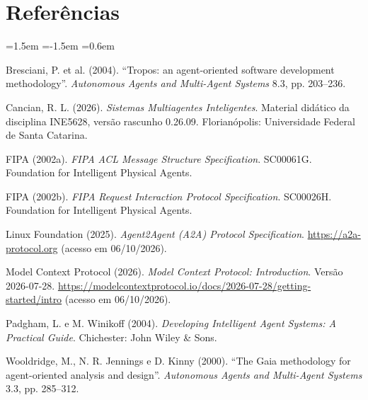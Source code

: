 \documentclass[10pt,a4paper]{article}
\begin{document}
\section*{Referências}
\begingroup\RaggedRight
\begin{list}{}{\leftmargin=1.5em \itemindent=-1.5em \itemsep=0.6em \parsep=0pt \topsep=0pt}
\item Bresciani, P. et al. (2004). “Tropos: an agent-oriented software development methodology”. \emph{Autonomous Agents and Multi-Agent Systems} 8.3, pp. 203–236.
\item Cancian, R. L. (2026). \emph{Sistemas Multiagentes Inteligentes}. Material didático da disciplina INE5628, versão rascunho 0.26.09. Florianópolis: Universidade Federal de Santa Catarina.
\item FIPA (2002a). \emph{FIPA ACL Message Structure Specification}. SC00061G. Foundation for Intelligent Physical Agents.
\item FIPA (2002b). \emph{FIPA Request Interaction Protocol Specification}. SC00026H. Foundation for Intelligent Physical Agents.
\item Linux Foundation (2025). \emph{Agent2Agent (A2A) Protocol Specification}. \url{https://a2a-protocol.org} (acesso em 06/10/2026).
\item Model Context Protocol (2026). \emph{Model Context Protocol: Introduction}. Versão 2026-07-28. \url{https://modelcontextprotocol.io/docs/2026-07-28/getting-started/intro} (acesso em 06/10/2026).
\item Padgham, L. e M. Winikoff (2004). \emph{Developing Intelligent Agent Systems: A Practical Guide}. Chichester: John Wiley \& Sons.
\item Wooldridge, M., N. R. Jennings e D. Kinny (2000). “The Gaia methodology for agent-oriented analysis and design”. \emph{Autonomous Agents and Multi-Agent Systems} 3.3, pp. 285–312.
\end{list}
\endgroup
\end{document}

